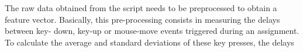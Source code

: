 \documentclass[a4paper,twoside]{article}
\begin{document}


The raw data
obtained from the script needs to be preprocessed to obtain a feature vector.
Basically, this pre-processing consists in measuring the delays between key-
down, key-up or mouse-move events triggered during an assignment.
%
%
To calculate the average and standard deviations of these key presses, the delays
\end{document}
